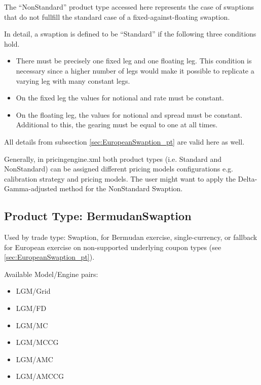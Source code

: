 The ``NonStandard'' product type accessed here represents the case of swaptions that do not fullfill
the standard case of a fixed-against-floating swaption.

In detail, a swaption is defined to be ``Standard'' if the following three conditions hold.

\begin{itemize}
    \item There must be precisely one fixed leg and one floating leg. This condition is necessary since a higher number of legs would
        make it possible to replicate a varying leg with many constant legs.
    \item On the fixed leg the values for notional and rate must be constant.
    \item On the floating leg, the values for notional and spread must be constant.
    Additional to this, the gearing must be equal to one at all times.
\end{itemize}

All details from subsection \ref{sec:EuropeanSwaption_pt} are valid here as well.

Generally, in pricingengine.xml both product types (i.e. Standard and NonStandard) can be assigned different pricing models configurations e.g.
calibration strategy and pricing models. The user might want to apply the Delta-Gamma-adjusted method for the NonStandard Swaption.

\subsection{Product Type: BermudanSwaption}
\label{sec:BermudanSwaption_pt}
Used by trade type: Swaption, for Bermudan exercise, single-currency, or fallback for European exercise on non-supported
underlying coupon types (see \ref{sec:EuropeanSwaption_pt}).

Available Model/Engine pairs:

\begin{itemize}
\item LGM/Grid
\item LGM/FD
\item LGM/MC
\item LGM/MCCG
\item LGM/AMC
\item LGM/AMCCG
\end{itemize}

